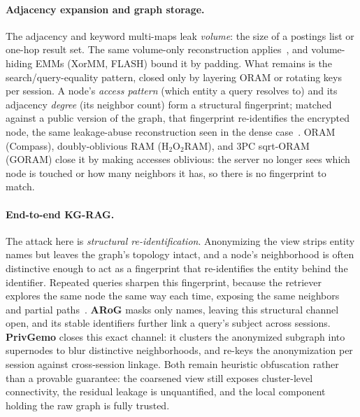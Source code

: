 \paragraph{Adjacency expansion and graph storage.}
The adjacency and keyword multi-maps leak \emph{volume}: the size of a postings list or one-hop
result set. The same volume-only reconstruction applies~\citep{blackstone_revisiting_2020}, and
volume-hiding EMMs (XorMM, FLASH) bound it by padding. What remains is the search/query-equality
pattern, closed only by layering ORAM or rotating keys per session. A node's \emph{access pattern} (which entity a query resolves to) and its adjacency \emph{degree}
(its neighbor count) form a structural fingerprint; matched against a public version of the graph,
that fingerprint re-identifies the encrypted node, the same leakage-abuse reconstruction seen in
the dense case~\citep{kellaris2016leakage}. ORAM (Compass), doubly-oblivious RAM (H$_2$O$_2$RAM),
and 3PC sqrt-ORAM (GORAM) close it by making accesses oblivious: the server no longer sees which
node is touched or how many neighbors it has, so there is no fingerprint to match.

\paragraph{End-to-end KG-RAG.}
The attack here is \emph{structural re-identification}. Anonymizing the view strips entity names
but leaves the graph's topology intact, and a node's neighborhood is often distinctive enough to
act as a fingerprint that re-identifies the entity behind the identifier. Repeated queries sharpen
this fingerprint, because the retriever explores the same node the same way each time, exposing the
same neighbors and partial paths~\citep{tan_privgemo}. \textbf{ARoG} masks only names,
leaving this structural channel open, and its stable identifiers further link a query's subject
across sessions. \textbf{PrivGemo} closes this exact channel: it
clusters the anonymized subgraph into supernodes to blur distinctive neighborhoods, and re-keys the
anonymization per session against cross-session linkage. Both remain heuristic obfuscation rather
than a provable guarantee: the coarsened view still exposes cluster-level connectivity, the
residual leakage is unquantified, and the local component holding the raw graph is fully trusted.

